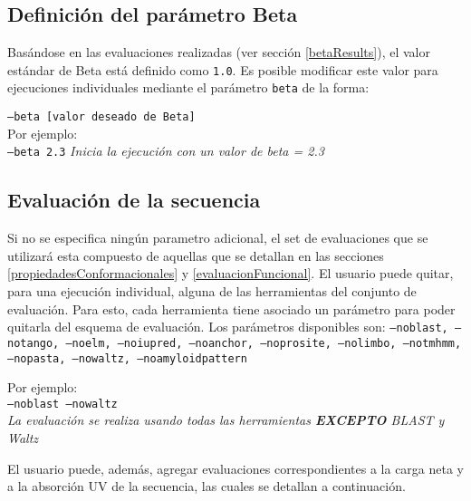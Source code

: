 \subsection{Definición del parámetro Beta}

Basándose en las evaluaciones realizadas (ver sección \ref{betaResults}), el valor estándar de Beta está definido como \texttt{1.0}. 
Es posible modificar este valor para ejecuciones individuales mediante el parámetro \texttt{beta} de la forma:

\indent \texttt{--beta [valor deseado de Beta]} 
\\Por ejemplo: \\
\indent \texttt{--beta 2.3} \hspace{0.5cm} \textit{Inicia la ejecución con un valor de beta = 2.3}



\subsection{Evaluación de la secuencia}\label{evaluacion}

Si no se especifica ningún parametro adicional, el set de evaluaciones que se utilizará esta compuesto de aquellas que se detallan en las secciones \ref{propiedadesConformacionales} y \ref{evaluacionFuncional}.
El usuario puede quitar, para una ejecución individual, alguna de las herramientas del conjunto de evaluación. Para esto, cada herramienta tiene asociado un parámetro para poder quitarla del esquema de evaluación.
Los parámetros disponibles son: 
\texttt{--noblast, --notango, --noelm, --noiupred, --noanchor, --noprosite, 
--nolimbo, 
--notmhmm, 
--nopasta, 
--nowaltz, 
--noamyloidpattern}

\noindent Por ejemplo: \\
\indent \texttt{--noblast --nowaltz} \\%
\indent \indent \textit{La evaluación se realiza usando todas las herramientas \textbf{EXCEPTO} BLAST y Waltz}




El usuario puede, además, agregar evaluaciones correspondientes a la carga neta y a la absorción UV de la secuencia, las cuales se detallan a continuación.

